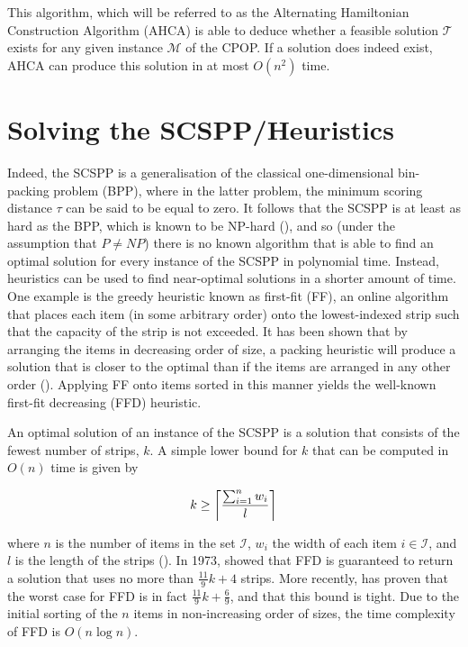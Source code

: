 \documentclass[oribibl]{llncs}
\begin{document}
This algorithm, which will be referred to as the Alternating Hamiltonian Construction Algorithm (AHCA) is able to deduce whether a feasible solution $\mathcal{T}$ exists for any given instance $\mathcal{M}$ of the CPOP. If a solution does indeed exist, AHCA can produce this solution in at most $O(n^2)$ time.

\section{Solving the SCSPP/Heuristics}
\label{sec:scsppsoln}

Indeed, the SCSPP is a generalisation of the classical one-dimensional bin-packing problem (BPP), where in the latter problem, the minimum scoring distance $\tau$ can be said to be equal to zero. It follows that the SCSPP is at least as hard as the BPP, which is known to be NP-hard (\citealp{garey1979}), and so (under the assumption that $P \neq NP$) there is no known algorithm that is able to find an optimal solution for every instance of the SCSPP in polynomial time. Instead, heuristics can be used to find near-optimal solutions in a shorter amount of time. One example is the greedy heuristic known as first-fit (FF), an online algorithm that places each item (in some arbitrary order) onto the lowest-indexed strip such that the capacity of the strip is not exceeded. It has been shown that by arranging the items in decreasing order of size, a packing heuristic will produce a solution that is closer to the optimal than if the items are arranged in any other order (\citealp{johnson1974fast}). Applying FF onto items sorted in this manner yields the well-known first-fit decreasing (FFD) heuristic.

An optimal solution of an instance of the SCSPP is a solution that consists of the fewest number of strips, $k$. A simple lower bound for $k$ that can be computed in $O(n)$ time is given by

\begin{equation}
	\label{eqn:lowerbound}
	k \geq \ceil*{\frac{\sum_{i=1}^{n}w_i}{l}}
\end{equation}

where $n$ is the number of items in the set $\mathcal{I}$, $w_i$ the width of each item $i \in \mathcal{I}$, and $l$ is the length of the strips (\citealp{martello1990b}). In 1973, \citeauthor{johnson1973} showed that FFD is guaranteed to return a solution that uses no more than $\frac{11}{9}k + 4$ strips. More recently, \cite{dosa2007} has proven that the worst case for FFD is in fact $\frac{11}{9}k + \frac{6}{9}$, and that this bound is tight. Due to the initial sorting of the $n$ items in non-increasing order of sizes, the time complexity of FFD is $O(n\log n)$.
\end{document}
